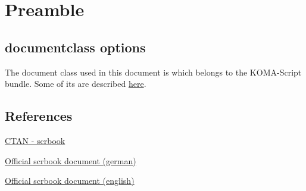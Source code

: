 \section{Preamble}
\subsection{documentclass options}
The document class used in this document is
 which belongs to the
KOMA-Script bundle. Some of its  are described
\href{http://www.pirbot.com/mirrors/ctan/macros/latex/contrib/koma-script/doc/scrguide.pdf#section.2.4}
{here}.
\subsection{References}
\begin{tst-default-list}
    \item{\href{https://ctan.org/pkg/scrbook}{CTAN - scrbook}}
    \item{\href{http://www.pirbot.com/mirrors/ctan/macros/latex/contrib/koma-script/doc/scrguide.pdf}{Official scrbook document (german)}}
    \item{\href{http://www.pirbot.com/mirrors/ctan/macros/latex/contrib/koma-script/doc/scrguien.pdf}{Official scrbook document (english)}}
\end{tst-default-list}

